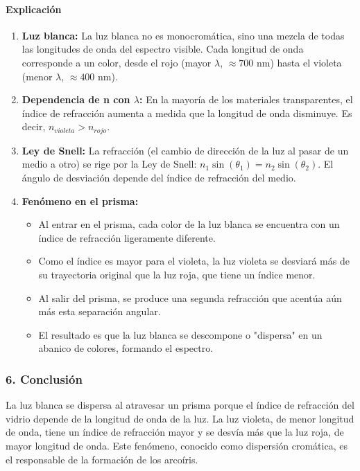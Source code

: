 \paragraph*{Explicación}
\begin{enumerate}
    \item \textbf{Luz blanca:} La luz blanca no es monocromática, sino una mezcla de todas las longitudes de onda del espectro visible. Cada longitud de onda corresponde a un color, desde el rojo (mayor $\lambda$, $\approx 700$ nm) hasta el violeta (menor $\lambda$, $\approx 400$ nm).
    \item \textbf{Dependencia de n con $\lambda$:} En la mayoría de los materiales transparentes, el índice de refracción aumenta a medida que la longitud de onda disminuye. Es decir, $n_{violeta} > n_{rojo}$.
    \item \textbf{Ley de Snell:} La refracción (el cambio de dirección de la luz al pasar de un medio a otro) se rige por la Ley de Snell: $n_1 \sin(\theta_1) = n_2 \sin(\theta_2)$. El ángulo de desviación depende del índice de refracción del medio.
    \item \textbf{Fenómeno en el prisma:}
    \begin{itemize}
        \item Al entrar en el prisma, cada color de la luz blanca se encuentra con un índice de refracción ligeramente diferente.
        \item Como el índice es mayor para el violeta, la luz violeta se desviará más de su trayectoria original que la luz roja, que tiene un índice menor.
        \item Al salir del prisma, se produce una segunda refracción que acentúa aún más esta separación angular.
        \item El resultado es que la luz blanca se descompone o "dispersa" en un abanico de colores, formando el espectro.
    \end{itemize}
\end{enumerate}

\subsubsection*{6. Conclusión}
\begin{cajaconclusion}
La luz blanca se dispersa al atravesar un prisma porque el índice de refracción del vidrio depende de la longitud de onda de la luz. La luz violeta, de menor longitud de onda, tiene un índice de refracción mayor y se desvía más que la luz roja, de mayor longitud de onda. Este fenómeno, conocido como dispersión cromática, es el responsable de la formación de los arcoíris.
\end{cajaconclusion}


